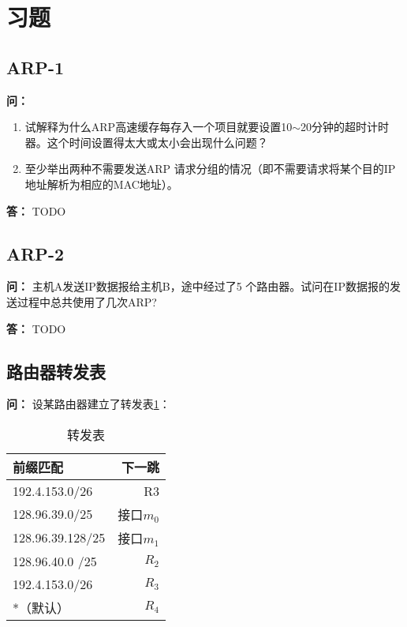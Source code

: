 \documentclass[12pt,hyperref,a4paper,UTF8]{ctexart}
\begin{document}
\newpage

\section{习题}

\subsection{ARP-1}
\textbf{问：}
\begin{enumerate}[label=\Roman*,leftmargin=2.2\parindent]
    \item 试解释为什么ARP高速缓存每存入一个项目就要设置10$\sim$20分钟的超时计时器。这个时间设置得太大或太小会出现什么问题？

    \item 至少举出两种不需要发送ARP 请求分组的情况（即不需要请求将某个目的IP地址解析为相应的MAC地址）。
\end{enumerate}

\textbf{答：}
TODO

\subsection{ARP-2}
\textbf{问：}
主机A发送IP数据报给主机B，途中经过了5 个路由器。试问在IP数据报的发送过程中总共使用了几次ARP?

\textbf{答：}
TODO

\subsection{路由器转发表}
\textbf{问：}
设某路由器建立了转发表\ref{tab:转发表}：
\begin{table}[h!]
    \centering
    \renewcommand{\arraystretch}{1}
    \setlength{\tabcolsep}{30pt}
    \begin{tabular}{l|r}
    \toprule
    前缀匹配    &   下一跳\\
    \midrule
    192.4.153.0/26  &   R3\\
    128.96.39.0/25  &   接口$m_0$\\
    128.96.39.128/25    &   接口$m_1$\\
    128.96.40.0 /25 &   $R_2$\\
    192.4.153.0/26  &   $R_3$\\
    *（默认）   &   $R_4$\\
    \bottomrule
    \end{tabular}
    \caption{转发表}
    \label{tab:转发表}
\end{table}
\end{document}
